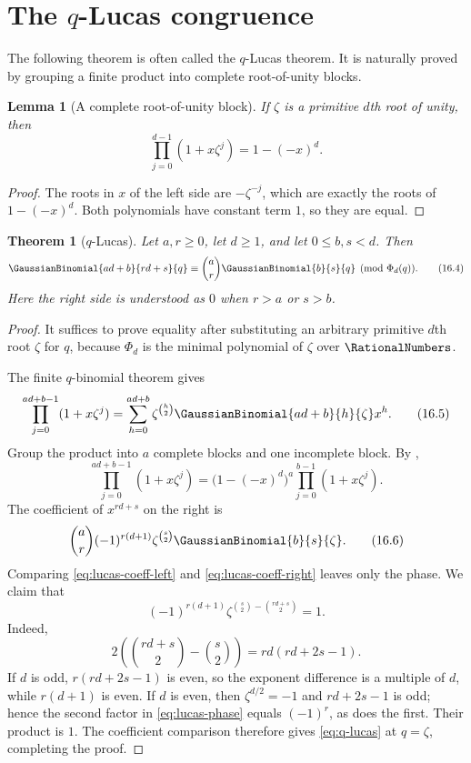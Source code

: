 \documentclass[11pt,a4paper,oneside,openany]{book}
\newtheorem{theorem}{Theorem}[chapter]
\newtheorem{lemma}[lemma]{Lemma}
\theoremstyle{definition}
\theoremstyle{remark}
\begin{document}
\section{The \texorpdfstring{$q$}{q}-Lucas congruence}

The following theorem is often called the $q$-Lucas theorem.  It is naturally proved by grouping a finite product into complete root-of-unity blocks.

\begin{lemma}[A complete root-of-unity block]\label{lem:root-block}
If $\zeta$ is a primitive $d$th root of unity, then
\[
 \prod_{j=0}^{d-1}(1+x\zeta^j)=1-(-x)^d.
 \tag{16.3}\label{eq:root-block}
\]
\end{lemma}

\begin{proof}
The roots in $x$ of the left side are $-\zeta^{-j}$, which are exactly the roots of $1-(-x)^d$.  Both polynomials have constant term $1$, so they are equal.
\end{proof}

\begin{theorem}[$q$-Lucas]\label{thm:q-lucas}
Let $a,r\ge0$, let $d\ge1$, and let $0\le b,s<d$.  Then
\[
 \GaussianBinomial{ad+b}{rd+s}{q}
 \equiv
 \binom ar\GaussianBinomial{b}{s}{q}
 \pmod{\Phi_d(q)}.
 \tag{16.4}\label{eq:q-lucas}
\]
Here the right side is understood as $0$ when $r>a$ or $s>b$.
\end{theorem}

\begin{proof}
It suffices to prove equality after substituting an arbitrary primitive $d$th root $\zeta$ for $q$, because $\Phi_d$ is the minimal polynomial of $\zeta$ over $\RationalNumbers$.

The finite $q$-binomial theorem gives
\[
 \prod_{j=0}^{ad+b-1}(1+x\zeta^j)
 =\sum_{h=0}^{ad+b}\zeta^{\binom h2}
   \GaussianBinomial{ad+b}{h}{\zeta}x^h.
 \tag{16.5}\label{eq:lucas-coeff-left}
\]
Group the product into $a$ complete blocks and one incomplete block.  By ,
\[
 \prod_{j=0}^{ad+b-1}(1+x\zeta^j)
 =\bigl(1-(-x)^d\bigr)^a
   \prod_{j=0}^{b-1}(1+x\zeta^j).
\]
The coefficient of $x^{rd+s}$ on the right is
\[
 \binom ar(-1)^{r(d+1)}
 \zeta^{\binom s2}\GaussianBinomial{b}{s}{\zeta}.
 \tag{16.6}\label{eq:lucas-coeff-right}
\]
Comparing \eqref{eq:lucas-coeff-left} and \eqref{eq:lucas-coeff-right} leaves only the phase.  We claim that
\[
 (-1)^{r(d+1)}
 \zeta^{\binom s2-\binom{rd+s}{2}}=1.
 \tag{16.7}\label{eq:lucas-phase}
\]
Indeed,
\[
 2\left(\binom{rd+s}{2}-\binom s2\right)
 =rd(rd+2s-1).
\]
If $d$ is odd, $r(rd+2s-1)$ is even, so the exponent difference is a multiple of $d$, while $r(d+1)$ is even.  If $d$ is even, then $\zeta^{d/2}=-1$ and $rd+2s-1$ is odd; hence the second factor in \eqref{eq:lucas-phase} equals $(-1)^r$, as does the first.  Their product is $1$.  The coefficient comparison therefore gives \eqref{eq:q-lucas} at $q=\zeta$, completing the proof.
\end{proof}
\end{document}
